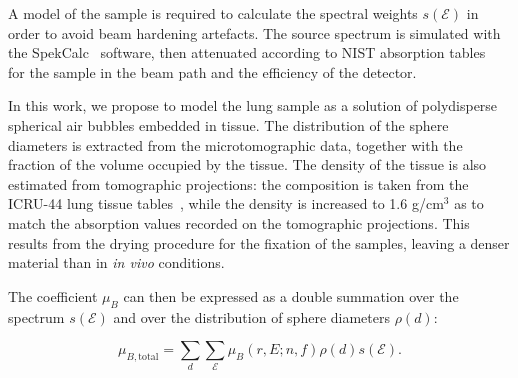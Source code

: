 \documentclass[preprint,12pt]{elsarticle}
\newcommand{\energy}{\mathcal{E}}
\begin{document}
A model of the sample is required to calculate the spectral weights
$s(\energy)$ in order to avoid beam hardening artefacts. The source spectrum is
simulated with the SpekCalc~\cite{spekcalc} software, then attenuated
according to NIST absorption tables~\cite{Hubbell_1995} for the sample in the beam path and the
efficiency of the detector.

In this work, we propose to model the lung sample as a solution of
polydisperse spherical air bubbles embedded in tissue. The distribution of
the sphere diameters is extracted from the microtomographic data, together
with the fraction of the volume occupied by the tissue. The density of the
tissue is also estimated from tomographic projections: the composition is
taken from the ICRU-44 lung tissue tables~\cite{White_1989}, while the density is increased to
1.6 g/cm$^3$ as to match the absorption values recorded on the tomographic
projections. This results from the drying procedure for the fixation of
the samples, leaving a denser material than in \emph{in vivo} conditions.

The coefficient $\mu_B$ can then be expressed as a double summation over the spectrum
$s(\energy)$ and over the distribution of sphere diameters $\rho(d)$:

\begin{equation}
    \mu_{B,\text{total}} = \sum_{d}\sum_{\energy} \mu_B(r, E; n, f)\rho(d)s(\energy)
    \label{eqn:totalsum}.
\end{equation}
\end{document}
